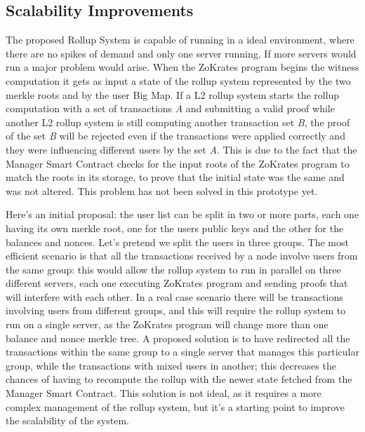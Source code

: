 \subsection{Scalability Improvements}

The proposed Rollup System is capable of running in a ideal environment, where there are no spikes of demand and only one server running. If more servers would run a major problem would arise. When the ZoKrates program begins the witness computation it gets as input a state of the rollup system represented by the two merkle roots and by the user Big Map. If a L2 rollup system starts the rollup computation with a set of transactions \textit{A} and submitting a valid proof while another L2 rollup system is still computing another transaction set \textit{B}, the proof of the set \textit{B} will be rejected even if the transactions were applied correctly and they were influencing different users by the set \textit{A}. This is due to the fact that the Manager Smart Contract checks for the input roots of the ZoKrates program to match the roots in its storage, to prove that the initial state was the same and was not altered. This problem has not been solved in this prototype yet.

Here's an initial proposal: the user list can be split in two or more parts, each one having its own merkle root, one for the users public keys and the other for the balances and nonces. Let's pretend we split the users in three groups. The most efficient scenario is that all the transactions received by a node involve users from the same group: this would allow the rollup system to run in parallel on three different servers, each one executing ZoKrates program and sending proofs that will interfere with each other. In a real case scenario there will be transactions involving users from different groups, and this will require the rollup system to run on a single server, as the ZoKrates program will change more than one balance and nonce merkle tree. A proposed solution is to have redirected all the transactions within the same group to a single server that manages this particular group, while the transactions with mixed users in another; this decreases the chances of having to recompute the rollup with the newer state fetched from the Manager Smart Contract. This solution is not ideal, as it requires a more complex management of the rollup system, but it's a starting point to improve the scalability of the system.